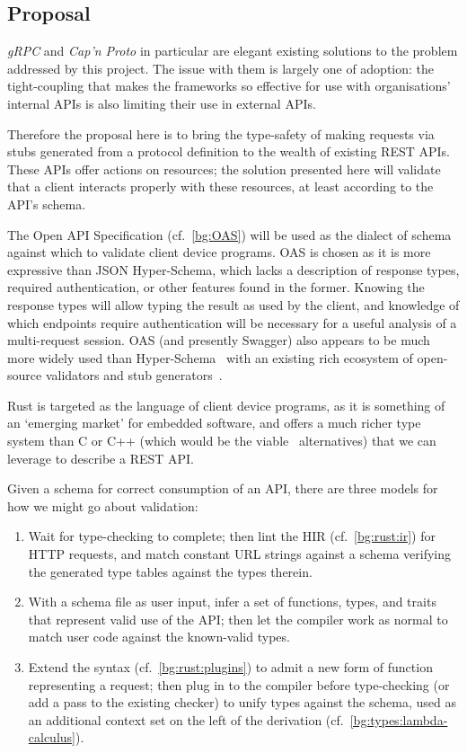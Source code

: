 \subsection{Proposal} \label{impl:proposal}

\emph{gRPC} and \emph{Cap'n Proto} in particular are elegant existing solutions to the problem addressed by this project. The issue with them is largely one of adoption: the tight-coupling that makes the frameworks so effective for use with organisations' internal APIs is also limiting their use in external APIs.

Therefore the proposal here is to bring the type-safety of making requests via stubs generated from a protocol definition to the wealth of existing REST APIs. These APIs offer actions on resources; the solution presented here will validate that a client interacts properly with these resources, at least according to the API's schema.

The Open API Specification (cf.~\cref{bg:OAS}) will be used as the dialect of schema against which to validate client device programs. OAS is chosen as it is more expressive than JSON Hyper-Schema, which lacks a description of response types, required authentication, or other features found in the former. Knowing the response types will allow typing the result as used by the client, and knowledge of which endpoints require authentication will be necessary for a useful analysis of a multi-request session. OAS (and presently Swagger) also appears to be much more widely used than Hyper-Schema~\cite{anyone_use_hyperschema} with an existing rich ecosystem of open-source validators and stub generators~\cite{swagger_oss}. \label{impl:proposal:schema}

Rust is targeted as the language of client device programs, as it is something of an `emerging market' for embedded software, and offers a much richer type system than C or C++ (which would be the viable~\cite{embedded_languages} alternatives) that we can leverage to describe a REST API. \label{impl:proposal:lang}

Given a schema for correct consumption of an API, there are three models for how we might go about validation:
\begin{enumerate}
	\item Wait for type-checking to complete; then lint the HIR (cf.~\cref{bg:rust:ir}) for HTTP requests, and match constant URL strings against a schema verifying the generated type tables against the types therein.
	\item With a schema file as user input, infer a set of functions, types, and traits that represent valid use of the API; then let the compiler work as normal to match user code against the known-valid types.
	\item Extend the syntax (cf.~\cref{bg:rust:plugins}) to admit a new form of function representing a request; then plug in to the compiler before type-checking (or add a pass to the existing checker) to unify types against the schema, used as an additional context set on the left of the derivation (cf.~\cref{bg:types:lambda-calculus}).
\end{enumerate} \label{impl:proposal:validation-models}


